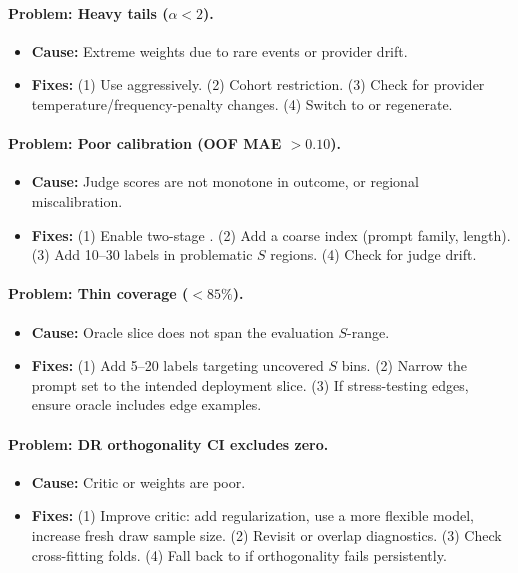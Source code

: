 \paragraph{Problem: Heavy tails ($\alpha < 2$).}
\begin{itemize}
\item \textbf{Cause:} Extreme weights due to rare events or provider drift.
\item \textbf{Fixes:} (1) Use \simcal{} aggressively. (2) Cohort restriction. (3) Check for provider temperature/frequency-penalty changes. (4) Switch to \dr{} or regenerate.
\end{itemize}

\paragraph{Problem: Poor calibration (OOF MAE $> 0.10$).}
\begin{itemize}
\item \textbf{Cause:} Judge scores are not monotone in outcome, or regional miscalibration.
\item \textbf{Fixes:} (1) Enable two-stage \autocal. (2) Add a coarse index (prompt family, length). (3) Add 10--30 labels in problematic $S$ regions. (4) Check for judge drift.
\end{itemize}

\paragraph{Problem: Thin coverage ($< 85\%$).}
\begin{itemize}
\item \textbf{Cause:} Oracle slice does not span the evaluation $S$-range.
\item \textbf{Fixes:} (1) Add 5--20 labels targeting uncovered $S$ bins. (2) Narrow the prompt set to the intended deployment slice. (3) If stress-testing edges, ensure oracle includes edge examples.
\end{itemize}

\paragraph{Problem: DR orthogonality CI excludes zero.}
\begin{itemize}
\item \textbf{Cause:} Critic or weights are poor.
\item \textbf{Fixes:} (1) Improve critic: add regularization, use a more flexible model, increase fresh draw sample size. (2) Revisit \simcal{} or overlap diagnostics. (3) Check cross-fitting folds. (4) Fall back to \ips{} if orthogonality fails persistently.
\end{itemize}

